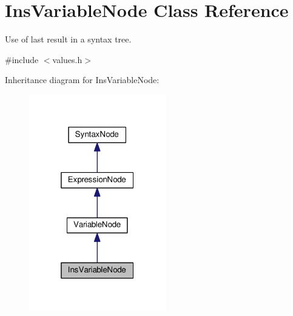 \hypertarget{classInsVariableNode}{}\section{Ins\+Variable\+Node Class Reference}
\label{classInsVariableNode}


Use of last result in a syntax tree.  




{\ttfamily \#include $<$values.\+h$>$}



Inheritance diagram for Ins\+Variable\+Node\+:
\nopagebreak
\begin{figure}[H]
\begin{center}
\leavevmode
\includegraphics[width=169pt]{d5/d9f/classInsVariableNode__inherit__graph}
\end{center}
\end{figure}


